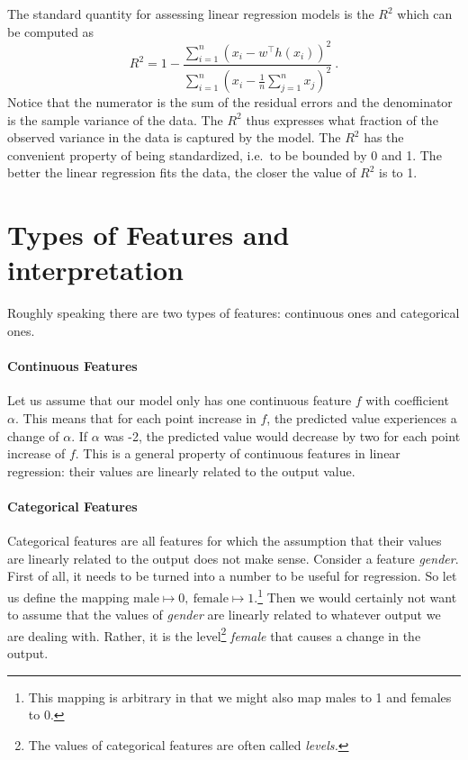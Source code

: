 \documentclass[11pt, leqno, a4paper]{article}
\begin{document}
The standard quantity for assessing linear regression models is the 
\href{https://en.wikipedia.org/wiki/Coefficient_of_determination}{$ R^{2} $} which can be computed as
\begin{equation}
R^{2} = 1 - \frac{\sum_{i=1}^{n} \left( x_{i} - w^{\top}h(x_{i}) \right)^{2}}
{\sum_{i=1}^{n} \left(x_{i} - \frac{1}{n}\sum_{j = 1}^{n}x_{j}\right)^{2}} \ .
\end{equation}
Notice that the numerator is the sum of the residual errors 
and the denominator is the sample variance of the data.
The $ R^{2} $ thus expresses what fraction of the observed variance in the data is captured by the model. The 
$ R^{2} $ has the convenient property of being standardized, i.e.\ to
be bounded by 0 and 1. The better the linear regression fits the data,
the closer the value of $R^2$ is to 1.


\section{Types of Features and interpretation}

Roughly speaking there are two types of features: continuous ones and categorical ones.

\paragraph{Continuous Features} Let us assume that our model only has one continuous feature $ f $ 
with coefficient $ \alpha $. This means that for each point increase in $ f $, the predicted value
experiences a change of $ \alpha $. If $ \alpha $ was -2, the predicted value would decrease by two
for each point increase of $ f $. This is a general property of continuous features in linear
regression: their values are linearly related to the output value.

\paragraph{Categorical Features} Categorical features are all features for which the assumption
that their values are linearly related to the output does not make sense. Consider a feature \textit{gender}.
First of all, it needs to be turned into a number to be useful for regression. So let us
define the mapping $ \text{male} \mapsto 0, \ \text{female} \mapsto 1 $.\footnote{This mapping
is arbitrary in that we might also map males to 1 and females to 0.} Then we would certainly not
want to assume that the values of \textit{gender} are linearly related to whatever output we are dealing
with. Rather, it is the level\footnote{The values of categorical features are often called \textit{levels.}}
\textit{female} that causes a change in the output.
\end{document}
